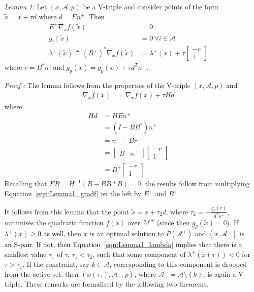 \documentclass[a4paper,twoside,10pt,english]{report}
\begin{document}
\emph{}%
\begin{framed}%
\emph{Lemma 1:} Let $\left(x,\mathcal{A},p\right)$ be a V-triple
and consider points of the form $\tilde{x}=x+\tau d$ where $d=En^{+}$.
Then 
\begin{align}
E^{+}\nabla_{x}f\left(\tilde{x}\right) &= 0\\
g_{i}\left(\tilde{x}\right) &= 0 ~ \forall i \in \mathcal{A}\\
\lambda^{+}\left(\tilde{x}\right)\triangleq\left(B^{+}\right)^{*}\nabla_{x}f\left(\tilde{x}\right) &= \lambda^{+}\left(x\right)+\tau\left[\begin{array}{c}
-r\\
1
\end{array}\right]\label{eqn:Lemma1_lambda}
\end{align}
where $r=B^{*}n^{+}$and $g_{p}\left(\tilde{x}\right)=g_{p}\left(x\right)+\tau d^{T}n^{+}$.

\emph{Proof : }The lemma follows from the properties of the V-triple
$(x,\mathcal{A},p)$ and
\begin{align}
\nabla_{x}f\left(\tilde{x}\right) &= \nabla_{x}f\left(x\right)+\tau Hd\label{eqn:Lemma1_gradf}
\end{align}
where 
\begin{align*}
Hd &= HEn^{+}\\
 &= \left(I-BB^{*}\right)n^{+}\\
 &= n^{+}-Br\\
 &= \left[\begin{array}{cc}
B & n^{+}\end{array}\right]\left[\begin{array}{c}
-r\\
1
\end{array}\right]\\
 &= B^{+}\left[\begin{array}{c}
-r\\
1
\end{array}\right]
\end{align*}
Recalling that $EB=H^{-1}\left(B-BB*B\right)=0$, the results follow
from multiplying Equation~\ref{eqn:Lemma1_gradf} on the left by $E^{+}$
and $B^{+}$.\end{framed}

It follows from this lemma that the point $\tilde{x}=x+\tau_{2}d$,
where $\tau_{2}=-\frac{g_{p}\left(x\right)}{d^{T}n^{+}}$, minimises
the quadratic function $f\left(x\right)$ over $\mathcal{M}^{+}$
(since then $g_{p}\left(\tilde{x}\right)=0$). If $\lambda^{+}\left(\tilde{x}\right)\ge0$
as well, then $\tilde{x}$ is an optimal solution to $P\left(\mathcal{A}^{+}\right)$
and $\left(\tilde{x},\mathcal{A}^{+}\right)$ is an S-pair. If not,
then Equation~\ref{eqn:Lemma1_lambda} implies that there is a smallest
value $\tau_{1}$ of $\tau$, $\tau_{1}<\tau_{2}$, such that some
component of $\lambda^{+}\left(\tilde{x}\left(\tau\right)\right)<0$
for $\tau>\tau_{1}$. If the constraint, say $k\in\mathcal{A}$, corresponding
to this component is dropped from the active set, then $\left(\tilde{x}\left(\tau_{1}\right),\mathcal{A}^{-},p\right)$,
where $\mathcal{A}^{-}=\mathcal{A}\setminus\left\{ k\right\} $, is
again a V-triple. These remarks are formalised by the following two
theorems.
\end{document}
